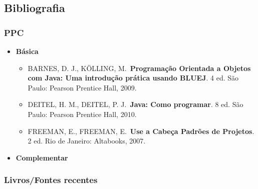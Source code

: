 \documentclass[a4paper, 12pt]{article}
\begin{document}
\subsection{Bibliografia}

\subsubsection{PPC}

\begin{itemize}
    \item \textbf{Básica}
        \begin{itemize}
            \item BARNES, D. J., KÖLLING, M. \textbf{Programação Orientada a Objetos com Java: Uma introdução prática usando BLUEJ}. 4 ed. São Paulo: Pearson Prentice Hall, 2009.
            \item DEITEL, H. M., DEITEL, P. J. \textbf{Java: Como programar}. 8 ed. São Paulo: Pearson Prentice Hall, 2010.
            \item FREEMAN, E., FREEMAN, E. \textbf{Use a Cabeça Padrões de Projetos}. 2 ed. Rio de Janeiro: Altabooks, 2007.
        \end{itemize}
    \item \textbf{Complementar}
\end{itemize}

\subsubsection{Livros/Fontes recentes}
\end{document}
